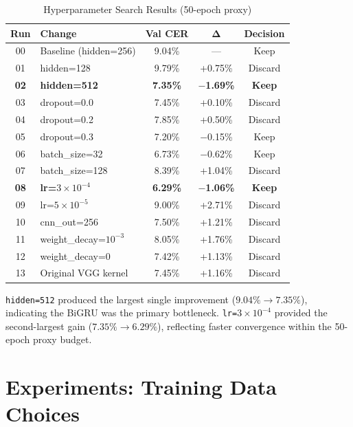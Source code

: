 \documentclass[conference]{IEEEtran}
\begin{document}
\begin{table}[h]
\centering
\caption{Hyperparameter Search Results (50-epoch proxy)}
\label{tab:hparam_search}
\begin{tabular}{@{}clccc@{}}
\toprule
\textbf{Run} & \textbf{Change} & \textbf{Val CER} & $\boldsymbol{\Delta}$ & \textbf{Decision} \\
\midrule
00 & Baseline (hidden=256)    & 9.04\% & ---     & Keep \\
01 & hidden=128               & 9.79\% & +0.75\% & Discard \\
\textbf{02} & \textbf{hidden=512} & \textbf{7.35\%} & \textbf{$-$1.69\%} & \textbf{Keep} \\
03 & dropout=0.0              & 7.45\% & +0.10\% & Discard \\
04 & dropout=0.2              & 7.85\% & +0.50\% & Discard \\
05 & dropout=0.3              & 7.20\% & $-$0.15\% & Keep \\
06 & batch\_size=32           & 6.73\% & $-$0.62\% & Keep \\
07 & batch\_size=128          & 8.39\% & +1.04\% & Discard \\
\textbf{08} & \textbf{lr=$3\times10^{-4}$} & \textbf{6.29\%} & \textbf{$-$1.06\%} & \textbf{Keep} \\
09 & lr=$5\times10^{-5}$      & 9.00\% & +2.71\% & Discard \\
10 & cnn\_out=256             & 7.50\% & +1.21\% & Discard \\
11 & weight\_decay=$10^{-3}$  & 8.05\% & +1.76\% & Discard \\
12 & weight\_decay=0          & 7.42\% & +1.13\% & Discard \\
13 & Original VGG kernel      & 7.45\% & +1.16\% & Discard \\
\bottomrule
\end{tabular}
\end{table}

\texttt{hidden=512} produced the largest single improvement ($9.04\%\to7.35\%$), indicating the BiGRU was the primary bottleneck. \texttt{lr=$3\times10^{-4}$} provided the second-largest gain ($7.35\%\to6.29\%$), reflecting faster convergence within the 50-epoch proxy budget.

\section{Experiments: Training Data Choices}
\end{document}
